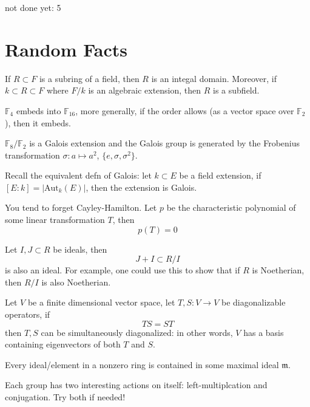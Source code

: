 \documentclass[openany]{book}
\newcommand{\F}{\mathbb{F}}
\begin{document}
not done yet: 5





\chapter{Random Facts}

\begin{prop}
    If $R\subset F$ is a subring of a field, then $R$ is an integal domain. Moreover, if $k\subset R\subset F$ where $F/k$ is an algebraic extension, then $R$ is a subfield.
\end{prop}

\begin{prop}
    $\F_4$ embeds into $\F_{16}$, more generally, if the order allows (as a vector space over $\F_2$), then it embeds.
\end{prop}

\begin{prop}
    $\F_8/\F_2$ is a Galois extension and the Galois group is generated by the Frobenius transformation $\sigma: a\mapsto a^2$, $\{e, \sigma, \sigma^2\}$.

    Recall the equivalent defn of Galois: let $k\subset E$ be a field extension, if $[E: k]=|\text{Aut}_k(E)|$, then the extension is Galois.
\end{prop}

\begin{prop}
    You tend to forget Cayley-Hamilton. Let $p$ be the characteristic polynomial of some linear transformation $T$, then 
    \begin{equation*}
        p(T)=0
    \end{equation*}
\end{prop}


\begin{prop}
    Let $I,J\subset R$ be ideals, then 
    \begin{equation*}
        J+I\subset R/I
    \end{equation*}
    is also an ideal. For example, one could use this to show that if $R$ is Noetherian, then $R/I$ is also Noetherian.
\end{prop}


\begin{prop}
    Let $V$ be a finite dimensional vector space, let $T,S: V\to V$ be diagonalizable operators, if 
    \begin{equation*}
        TS=ST
    \end{equation*}
    then $T,S$ can be simultaneously diagonalized: in other words, $V$ has a basis containing eigenvectors of both $T$ and $S$.
\end{prop}


\begin{prop}
    Every ideal/element in a nonzero ring is contained in some maximal ideal $\mathfrak{m}$.
\end{prop}

\begin{prop}
    Each group has two interesting actions on itself: left-multiplcation and conjugation. Try both if needed!
\end{prop}
\end{document}
